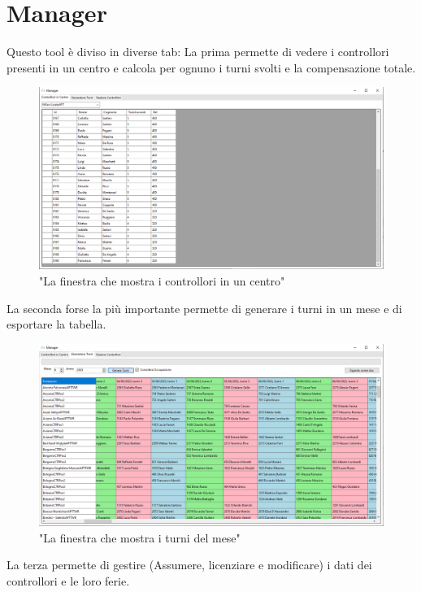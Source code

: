 \section{Manager}
Questo tool è diviso in diverse tab:
La prima permette di vedere i controllori presenti in un centro e calcola per ognuno i turni svolti e la compensazione totale.
\begin{figure}[H]
     \centering
     \includegraphics[width=1\textwidth]{figures/CIC.PNG}
     \caption{"La finestra che mostra i controllori in un centro"}
   \end{figure}
La seconda forse la più importante permette di generare i turni in un mese e di esportare la tabella.
   \begin{figure}[H]
        \centering
        \includegraphics[width=1\textwidth]{figures/shifts.PNG}
        \caption{"La finestra che mostra i turni del mese"}
      \end{figure}
\pagebreak
La terza permette di gestire (Assumere, licenziare e modificare) i dati dei controllori e le loro ferie.
